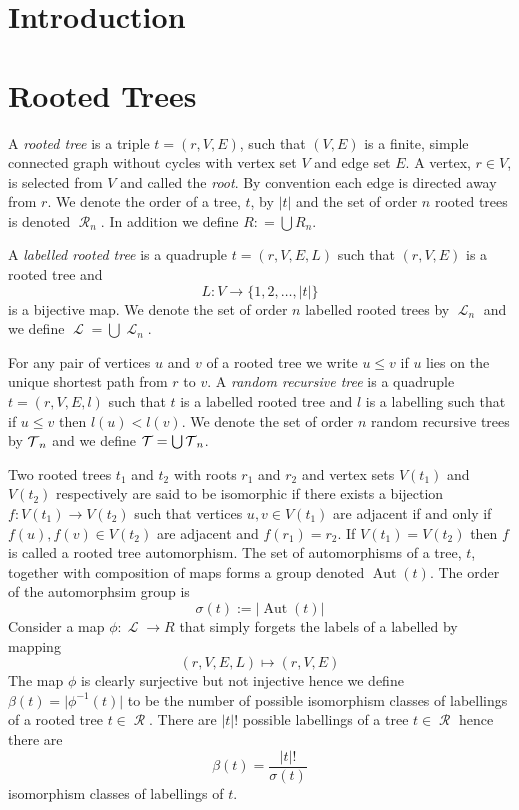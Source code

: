 
\DeclareMathOperator{\F}{\mathcal{F}}
\DeclareMathOperator{\R}{\mathcal{R}}
\DeclareMathOperator{\La}{\mathcal{L}}
\DeclareMathOperator{\V}{\mathcal{V}}
\DeclareMathOperator{\Aut}{Aut}
\usepackage{amssymb}

\section{Introduction}



\section{Rooted Trees}
 A \emph{rooted tree} is a triple $t = (r,V,E)$, such that $(V,E)$ is a finite, simple connected graph without cycles with 
 vertex set $V$ and edge set $E$. A vertex, $r \in V$, is selected from $V$ and called the \emph{root}. By convention each edge is directed away from $r$.  We denote the
 order of a tree, $t$, by $\lvert t \rvert$ and the set of order $n$ rooted trees is denoted $\R_n$.  In addition we define 
 $R : = \bigcup R_n$.
 
 A \emph{labelled rooted tree} is a quadruple $t = (r,V,E,L)$ such that $(r,V,E)$ is a rooted tree and 
 \[L: V \longrightarrow \{1,2,\dots,\lvert t \rvert\}\] 
is a bijective map.  We denote the set of order $n$ labelled rooted trees by $\La_n$ and we define $\La = \bigcup \La_n$.      

For any pair of vertices $u$ and $v$ of a rooted tree we write $u \leq v$ if $u$ lies on the unique shortest path from $r$ to $v$.  A 
\emph{random recursive tree} is a quadruple $t = (r,V,E,l)$ such that $t$ is a labelled rooted tree and $l$ is a labelling 
such that if $u \leq v$ then $l(u) < l(v)$. 
We denote the set of order $n$ random recursive trees by $\operatorname{\mathcal{T}}_n$ and we define $\operatorname{\mathcal{T}} = \bigcup \operatorname{\mathcal{T}}_n$. 


Two rooted trees $t_1$ and $t_2$ with roots $r_1$ and $r_2$ and vertex sets $V(t_1)$ and $V(t_2)$ respectively are said to be
isomorphic if there exists a bijection $f: V(t_1) \rightarrow V(t_2)$ such that 
vertices $u,v \in V(t_1)$ are adjacent if and only if $f(u),f(v) \in V(t_2)$ are adjacent and $f(r_1) = r_2$. If 
$V(t_1) = V(t_2)$ then $f$ is called a rooted tree automorphism.  The set of automorphisms of a tree, $t$, together with 
composition of maps forms a group denoted $\Aut(t)$.  The order of the automorphsim group is 
\[\sigma(t) := \lvert \Aut(t) \rvert\] 
Consider a map $\phi: \La \rightarrow R$ that simply forgets the labels of a labelled by mapping
\[
 (r,V,E,L) \mapsto (r,V,E)
\]
The map $\phi$ is clearly surjective but not injective hence we define $\beta(t) = \lvert \phi^{-1}(t) \rvert$ to be the number of
possible isomorphism classes of labellings of a rooted tree $t \in \R$. There are $\lvert t \rvert !$ possible labellings of a tree 
$t \in \R$ hence there are  
\begin{equation}\label{eq:1}
  \beta(t) = \frac{\lvert t \rvert !}{\sigma(t)} 
\end{equation}
isomorphism classes of labellings of $t$.  


